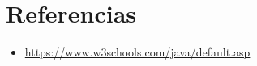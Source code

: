 \documentclass{article}
\begin{document}
\section{Referencias}
\begin{itemize}			
	\item \url{https://www.w3schools.com/java/default.asp}
\end{itemize}	
	
%
%
%
			
\end{document}
